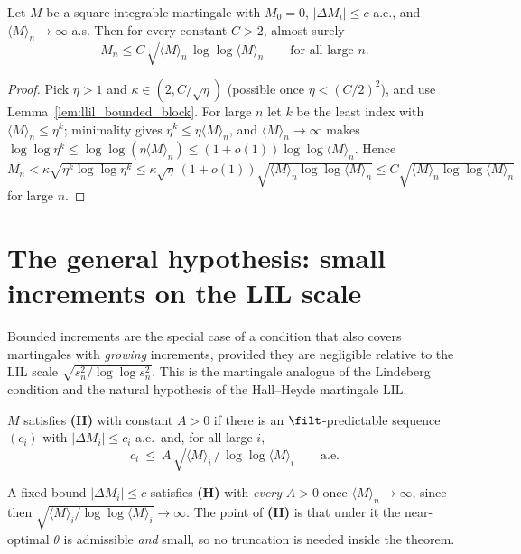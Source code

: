 \begin{theorem}\label{thm:llil_bounded}
\leanok
{}
Let $M$ be a square-integrable martingale with $M_0=0$, $|\Delta M_i|\le c$ a.e., and
$\langle M\rangle_n\to\infty$ a.s. Then for every constant $C>2$, almost surely
\[
  M_n\le C\,\sqrt{\langle M\rangle_n\,\log\log\langle M\rangle_n}\qquad
  \text{for all large }n.
\]
\end{theorem}
\begin{proof}\leanok
Pick $\eta>1$ and $\kappa\in(2,C/\sqrt\eta)$ (possible once $\eta<(C/2)^2$), and use
Lemma~\ref{lem:llil_bounded_block}. For large $n$ let $k$ be the least index with
$\langle M\rangle_n\le\eta^k$; minimality gives $\eta^k\le\eta\langle M\rangle_n$, and
$\langle M\rangle_n\to\infty$ makes $\log\log\eta^k\le\log\log(\eta\langle M\rangle_n)
\le(1+o(1))\log\log\langle M\rangle_n$. Hence
$M_n<\kappa\sqrt{\eta^k\log\log\eta^k}\le\kappa\sqrt\eta\,(1+o(1))
\sqrt{\langle M\rangle_n\log\log\langle M\rangle_n}\le C\sqrt{\langle M\rangle_n
\log\log\langle M\rangle_n}$ for large $n$.
\end{proof}

\section{The general hypothesis: small increments on the LIL scale}
\label{sec:llil_general}

Bounded increments are the special case of a condition that also covers martingales
with \emph{growing} increments, provided they are negligible relative to the LIL scale
$\sqrt{s_n^2/\log\log s_n^2}$. This is the martingale analogue of the Lindeberg
condition and the natural hypothesis of the Hall--Heyde martingale LIL.

\begin{definition}\label{def:llil_H}
$M$ satisfies \textbf{(H)} with constant $A>0$ if there is an $\filt$-predictable
sequence $(c_i)$ with $|\Delta M_i|\le c_i$ a.e.\ and, for all large $i$,
\[
  c_i\ \le\ A\,\sqrt{\langle M\rangle_i\,/\,\log\log\langle M\rangle_i}\qquad\text{a.e.}
\]
\end{definition}

A fixed bound $|\Delta M_i|\le c$ satisfies \textbf{(H)} with \emph{every} $A>0$ once
$\langle M\rangle_n\to\infty$, since then $\sqrt{\langle M\rangle_i/\log\log\langle
M\rangle_i}\to\infty$. The point of \textbf{(H)} is that under it the near-optimal
$\theta$ is admissible \emph{and} small, so no truncation is needed inside the theorem.

